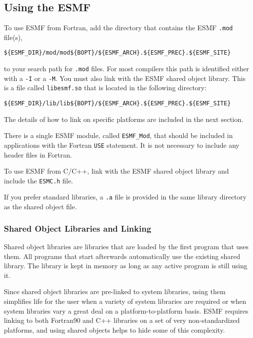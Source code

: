 
\subsection{Using the ESMF}
\label{UsingLibrary}

To use ESMF from Fortran, add the directory that contains
the ESMF {\tt *.mod} file(s),

\begin{verbatim}
${ESMF_DIR}/mod/mod${BOPT}/${ESMF_ARCH}.${ESMF_PREC}.${ESMF_SITE}
\end{verbatim} 

to your search path for {\tt *.mod} files.  For most compilers this path 
is identified either with a {\tt -I} or a {\tt -M}.  You must also link 
with the ESMF shared object library.  This is a file called 
{\tt libesmf.so} that is located in the following directory:

\begin{verbatim}
${ESMF_DIR}/lib/lib${BOPT}/${ESMF_ARCH}.${ESMF_PREC}.${ESMF_SITE}
\end{verbatim} 

The details of how to link on specific platforms are included in the 
next section.

There is a single ESMF module, called {\tt ESMF\_Mod}, that should be 
included in applications with the Fortran {\tt USE} statement.  It 
is not necessary to include any header files in Fortran.

To use ESMF from C/C++, link with the ESMF shared object library 
and include the {\tt ESMC.h} file. 

If you prefer standard libraries, a {\tt *.a} file is provided  
in the same library directory as the shared object file.  

\subsubsection{Shared Object Libraries and Linking}

Shared object libraries are libraries that are loaded by the first program 
that uses them. All programs that start afterwards automatically use the 
existing shared library. The library is kept in memory as long as any 
active program is still using it. 

Since shared object libraries are pre-linked to system libraries, using them
simplifies life for the user when a variety of system libraries are
required or when system libraries vary a great deal on a 
platform-to-platform basis.  ESMF requires linking to both Fortran90 and
C++ libraries on a set of very non-standardized platforms, and using
shared objects helps to hide some of this complexity.

